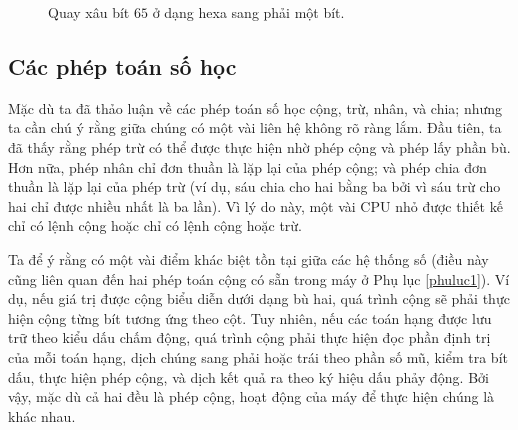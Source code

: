 \begin{figure}[tbh]
  \caption{Quay xâu bít $65$ ở dạng hexa sang phải một bít.}
  \label{fig:fig212}
\end{figure}

\subsection*{Các phép toán số học}

Mặc dù ta đã thảo luận về các phép toán số học cộng, trừ, nhân, và chia; nhưng ta cần chú
ý rằng giữa chúng có một vài liên hệ không rõ ràng lắm. Đầu tiên, ta đã thấy rằng phép trừ
có thể được thực hiện nhờ phép cộng và phép lấy phần bù. Hơn nữa, phép nhân chỉ đơn thuần
là lặp lại của phép cộng; và phép chia đơn thuần là lặp lại của phép trừ (ví dụ, sáu chia
cho hai bằng ba bởi vì sáu trừ cho hai chỉ được nhiều nhất là ba lần). Vì lý do này, một
vài CPU nhỏ được thiết kế chỉ có lệnh cộng hoặc chỉ có lệnh cộng hoặc trừ.

Ta để ý rằng có một vài điểm khác biệt tồn tại giữa các hệ thống số (điều này cũng
liên quan đến hai phép toán cộng có sẵn trong máy ở Phụ lục \ref{phuluc1}). Ví dụ, nếu giá
trị được cộng biểu diễn dưới dạng bù hai, quá trình cộng sẽ phải thực hiện cộng từng bít
tương ứng theo cột. Tuy nhiên, nếu các toán hạng được lưu trữ theo kiểu dấu chấm động, quá
trình cộng phải thực hiện đọc phần định trị của mỗi toán hạng, dịch chúng sang phải hoặc
trái theo phần số mũ, kiểm tra bít dấu, thực hiện phép cộng, và dịch kết quả ra theo ký
hiệu dấu phảy động. Bởi vậy, mặc dù cả hai đều là phép cộng, hoạt động của máy để thực
hiện chúng là khác nhau.

